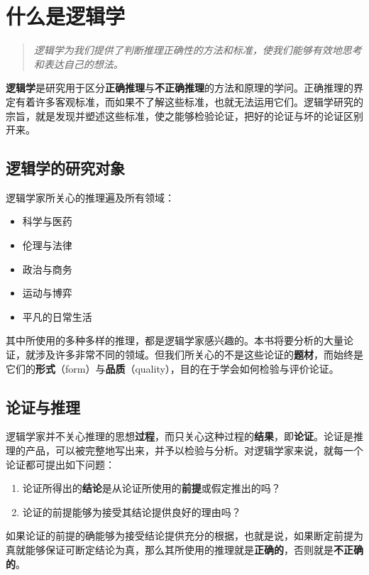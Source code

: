 \section{什么是逻辑学}

\begin{quotation}
\textit{逻辑学为我们提供了判断推理正确性的方法和标准，使我们能够有效地思考和表达自己的想法。}
\end{quotation}

\textbf{逻辑学}是研究用于区分\textbf{正确推理}与\textbf{不正确推理}的方法和原理的学问。正确推理的界定有着许多客观标准，而如果不了解这些标准，也就无法运用它们。逻辑学研究的宗旨，就是发现并塑述这些标准，使之能够检验论证，把好的论证与坏的论证区别开来。

\subsection{逻辑学的研究对象}

逻辑学家所关心的推理遍及所有领域：
\begin{itemize}
  \item 科学与医药
  \item 伦理与法律
  \item 政治与商务
  \item 运动与博弈
  \item 平凡的日常生活
\end{itemize}

其中所使用的多种多样的推理，都是逻辑学家感兴趣的。本书将要分析的大量论证，就涉及许多非常不同的领域。但我们所关心的不是这些论证的\textbf{题材}，而始终是它们的\textbf{形式}（form）与\textbf{品质}（quality），目的在于学会如何检验与评价论证。

\subsection{论证与推理}

逻辑学家并不关心推理的思想\textbf{过程}，而只关心这种过程的\textbf{结果}，即\textbf{论证}。论证是推理的产品，可以被完整地写出来，并予以检验与分析。对逻辑学家来说，就每一个论证都可提出如下问题：
\begin{enumerate}
  \item 论证所得出的\textbf{结论}是从论证所使用的\textbf{前提}或假定推出的吗？
  \item 论证的前提能够为接受其结论提供良好的理由吗？
\end{enumerate}

如果论证的前提的确能够为接受结论提供充分的根据，也就是说，如果断定前提为真就能够保证可断定结论为真，那么其所使用的推理就是\textbf{正确的}，否则就是\textbf{不正确的}。

